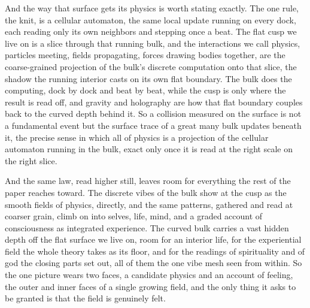 And the way that surface gets its physics is worth stating exactly. The one rule, the knit, is a cellular automaton, the same local update running on every dock, each reading only its own neighbors and stepping once a beat. The flat cusp we live on is a slice through that running bulk, and the interactions we call physics, particles meeting, fields propagating, forces drawing bodies together, are the coarse-grained projection of the bulk's discrete computation onto that slice, the shadow the running interior casts on its own flat boundary. The bulk does the computing, dock by dock and beat by beat, while the cusp is only where the result is read off, and gravity and holography are how that flat boundary couples back to the curved depth behind it. So a collision measured on the surface is not a fundamental event but the surface trace of a great many bulk updates beneath it, the precise sense in which all of physics is a projection of the cellular automaton running in the bulk, exact only once it is read at the right scale on the right slice.

And the same law, read higher still, leaves room for everything the rest of the paper reaches toward. The discrete vibes of the bulk show at the cusp as the smooth fields of physics, directly, and the same patterns, gathered and read at coarser grain, climb on into selves, life, mind, and a graded account of consciousness as integrated experience. The curved bulk carries a vast hidden depth off the flat surface we live on, room for an interior life, for the experiential field the whole theory takes as its floor, and for the readings of spirituality and of god the closing parts set out, all of them the one vibe mesh seen from within. So the one picture wears two faces, a candidate physics and an account of feeling, the outer and inner faces of a single growing field, and the only thing it asks to be granted is that the field is genuinely felt.
